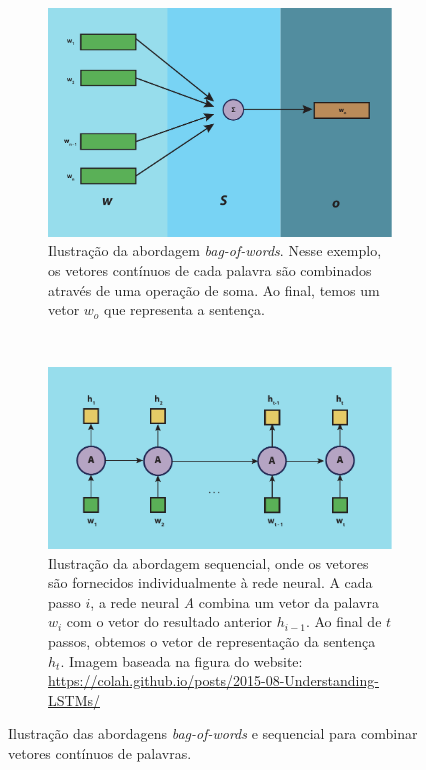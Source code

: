 \begin{figure}[H]
\centering
\begin{subfigure}{.7\textwidth}
  \centering
  \includegraphics[width=1\linewidth]{figuras/cap-trabalhos-relacionados/sentence-representation-bag-of-words.pdf}
  \caption{Ilustração da abordagem \textit{bag-of-words}. Nesse exemplo, os vetores contínuos de cada palavra são combinados através de uma operação de soma. Ao final, temos um vetor $w_{o}$ que representa a sentença.}
  \label{fig:sentence-representation-bag-of-words}
\end{subfigure}%
\\
\begin{subfigure}{.7\textwidth}
  \centering
  \includegraphics[width=1\linewidth]{figuras/cap-trabalhos-relacionados/sentence-representation-sequential.pdf}
  \caption{Ilustração da abordagem sequencial, onde os vetores são fornecidos individualmente à rede neural. A cada passo $i$, a rede neural \emph{A} combina um vetor da palavra $w_{i}$ com o vetor do resultado anterior $h_{i - 1}$. Ao final de $t$ passos, obtemos o vetor de representação da sentença $h_{t}$. Imagem baseada na figura do website: \url{https://colah.github.io/posts/2015-08-Understanding-LSTMs/}}
  \label{fig:sentence-representation-sequential}
\end{subfigure}

\caption{Ilustração das abordagens \textit{bag-of-words} e sequencial para combinar vetores contínuos de palavras.}
\label{fig:sentence-representation}
\end{figure}


